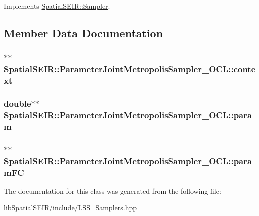 Implements \hyperlink{classSpatialSEIR_1_1Sampler_aaa79310ad809e6aeb25479849f322dda}{Spatial\-S\-E\-I\-R\-::\-Sampler}.



\subsection{Member Data Documentation}
\hypertarget{classSpatialSEIR_1_1ParameterJointMetropolisSampler__OCL_acce9d454489373f0549af4f15dade51a}{
\subsubsection[{context}]{$\ast$$\ast$ Spatial\-S\-E\-I\-R\-::\-Parameter\-Joint\-Metropolis\-Sampler\-\_\-\-O\-C\-L\-::context}}\label{classSpatialSEIR_1_1ParameterJointMetropolisSampler__OCL_acce9d454489373f0549af4f15dade51a}
\hypertarget{classSpatialSEIR_1_1ParameterJointMetropolisSampler__OCL_aa010e1643feb5965065efb65fd101a6f}{
\subsubsection[{param}]{\setlength{\rightskip}{0pt plus 5cm}double$\ast$$\ast$ Spatial\-S\-E\-I\-R\-::\-Parameter\-Joint\-Metropolis\-Sampler\-\_\-\-O\-C\-L\-::param}}\label{classSpatialSEIR_1_1ParameterJointMetropolisSampler__OCL_aa010e1643feb5965065efb65fd101a6f}
\hypertarget{classSpatialSEIR_1_1ParameterJointMetropolisSampler__OCL_a143445da6bf7037f86020e04185f4472}{
\subsubsection[{param\-F\-C}]{$\ast$$\ast$ Spatial\-S\-E\-I\-R\-::\-Parameter\-Joint\-Metropolis\-Sampler\-\_\-\-O\-C\-L\-::param\-F\-C}}\label{classSpatialSEIR_1_1ParameterJointMetropolisSampler__OCL_a143445da6bf7037f86020e04185f4472}


The documentation for this class was generated from the following file\-:\begin{DoxyCompactItemize}
\item 
lib\-Spatial\-S\-E\-I\-R/include/\hyperlink{LSS__Samplers_8hpp}{L\-S\-S\-\_\-\-Samplers.\-hpp}\end{DoxyCompactItemize}
